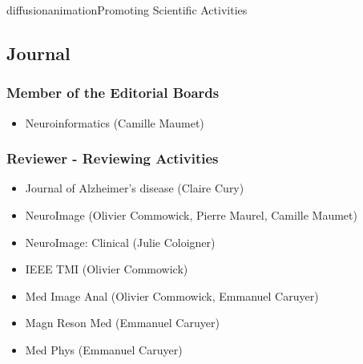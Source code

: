 \documentclass{ra2018}
\begin{document}
\begin{module}{diffusion}{animation}{Promoting Scientific Activities}
\subsection{Journal}
    \subsubsection{Member of the Editorial Boards}
    \begin{itemize}
        \item Neuroinformatics (Camille Maumet)
    \end{itemize}   
    \subsubsection{Reviewer - Reviewing Activities}
    \begin{itemize}
        \item Journal of Alzheimer's disease (Claire Cury)
        \item NeuroImage (Olivier Commowick, Pierre Maurel, Camille Maumet)
        \item NeuroImage: Clinical (Julie Coloigner)
        \item IEEE TMI (Olivier Commowick)
        \item Med Image Anal (Olivier Commowick, Emmanuel Caruyer)
	\item Magn Reson Med (Emmanuel Caruyer)
	\item Med Phys (Emmanuel Caruyer)
    \end{itemize}    

\end{module}
\end{document}
